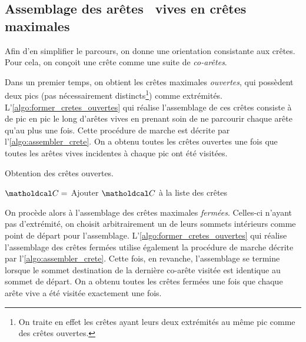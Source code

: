\subsection{Assemblage des arêtes \brep\ vives en crêtes maximales}
Afin d'en simplifier le parcours, on donne une orientation consistante aux crêtes. 
Pour cela, on conçoit une crête comme une suite de \textit{co-arêtes}.
\par
Dans un premier temps, on obtient les crêtes maximales \textit{ouvertes}, \ie qui possèdent deux pics (pas nécessairement distincts\footnote{On traite en effet les crêtes ayant leurs deux extrémités au même pic comme des crêtes ouvertes.}) comme extrémités. 
L'\autoref{algo:former_cretes_ouvertes} qui réalise l'assemblage de ces crêtes consiste à  de pic en pic le long d'arêtes vives en prenant soin de ne parcourir chaque arête qu'au plus une fois. 
Cette procédure de marche est décrite par l'\autoref{algo:assembler_crete}. 
On a obtenu toutes les crêtes ouvertes une fois que toutes les arêtes vives incidentes à chaque pic ont été visitées. 


\begin{algorithm}
	\caption{Obtention des crêtes ouvertes.}\label{algo:former_cretes_ouvertes}
	\begin{algorithmic}[1]
					\State $\crete = $ 
					\State Ajouter $\crete$ à la liste des crêtes
				\EndFor
			\EndFor
	\end{algorithmic}
\end{algorithm}

\par
On procède alors à l'assemblage des crêtes maximales \textit{fermées}. 
Celles-ci n'ayant pas d'extrémité, on choisit arbitrairement un de leurs sommets intérieurs comme point de départ pour l'assemblage. 
L'\autoref{algo:former_cretes_ouvertes} qui réalise l'assemblage des crêtes fermées utilise également la procédure de marche décrite par l'\autoref{algo:assembler_crete}. 
Cette fois, en revanche, l'assemblage se termine lorsque le sommet destination de la dernière co-arête visitée est identique au sommet de départ. 
On a obtenu toutes les crêtes fermées une fois que chaque arête vive a été visitée exactement une fois. 

